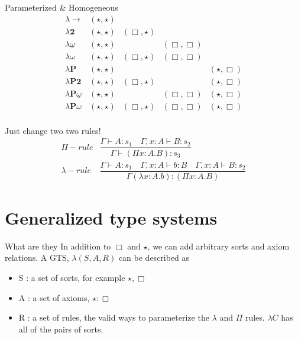 \documentclass{beamer}
\begin{document}
    \begin{frame}{Parameterized \& Homogeneous}
        \[\begin{array}{l|cccc}
            \lambda\rightarrow & (\star, \star)\\
            \lambda \textbf{2} & (\star, \star) & (\Box, \star) \\
            \lambda \underline\omega & (\star, \star) && (\Box, \Box) \\
            \lambda \omega& (\star, \star) & (\Box, \star) & (\Box, \Box) \\
            \lambda\textbf{P} & (\star, \star) &&& (\star, \Box)\\
            \lambda \textbf{P2} & (\star, \star) & (\Box, \star)&& (\star, \Box) \\
            \lambda \textbf{P}\underline\omega & (\star, \star) && (\Box, \Box)& (\star, \Box) \\
            \lambda \textbf{P}\omega& (\star, \star) & (\Box, \star) & (\Box, \Box)&(\star, \Box) \\
        \end{array}\]
    \end{frame}

    \begin{frame}{Just change two two rules!}
        \[\begin{array}{lc}
            \Pi{-}rule & \dfrac{\Gamma \vdash A : s_1\quad \Gamma, x : A \vdash B : s_2}{\Gamma \vdash (\Pi x : A . B) : s_3} \\[1cm]
            \lambda{-}rule &\dfrac{\Gamma \vdash A : s_1\quad \Gamma, x : A \vdash b : B\quad \Gamma, x : A \vdash B : s_2}{\Gamma (\lambda x: A .b) : (\Pi x : A . B)}
        \end{array}\]
    \end{frame}

    \section{Generalized type systems}

    \begin{frame}{What are they}
        In addition to $\Box$ and $\star$, we can add arbitrary sorts and axiom relations. A GTS, $\lambda(S, A, R)$ can be described as 
        \begin{itemize}
            \item<1-> S : a set of sorts, for example $\star, \Box$
            \item<2-> A : a set of axioms, $\star : \Box$
            \item<3-> R : a set of rules, the valid ways to parameterize the $\lambda$ and $\Pi$ rules. $\lambda C$ has all of the pairs of sorts.
        \end{itemize}
    \end{frame}
\end{document}

